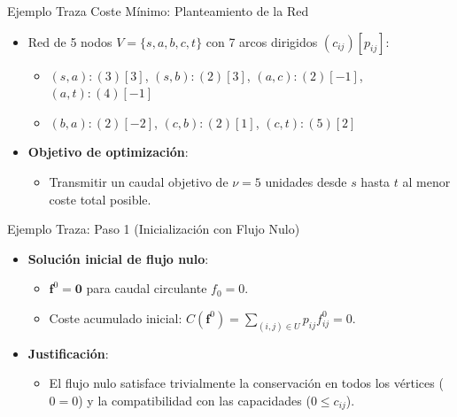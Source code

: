 \documentclass[
  ignorenonframetext,
]{beamer}
\providecommand{\tightlist}{%
  \setlength{\itemsep}{0pt}\setlength{\parskip}{0pt}}
\begin{document}
\begin{frame}{Ejemplo Traza Coste Mínimo: Planteamiento de la Red}
\label{ejemplo-traza-coste-muxednimo-planteamiento-de-la-red}
\begin{itemize}
\tightlist
\item
  Red de 5 nodos \(V = \{s, a, b, c, t\}\) con 7 arcos dirigidos
  \((c_{ij})[p_{ij}]\):

  \begin{itemize}
  \tightlist
  \item
    \((s,a): (3)[3]\), \((s,b): (2)[3]\), \((a,c): (2)[-1]\),
    \((a,t): (4)[-1]\)
  \item
    \((b,a): (2)[-2]\), \((c,b): (2)[1]\), \((c,t): (5)[2]\)
  \end{itemize}
\item
  \textbf{Objetivo de optimización}:

  \begin{itemize}
  \tightlist
  \item
    Transmitir un caudal objetivo de \(\nu = 5\) unidades desde \(s\)
    hasta \(t\) al menor coste total posible.
  \end{itemize}
\end{itemize}
\end{frame}

\begin{frame}{Ejemplo Traza: Paso 1 (Inicialización con Flujo Nulo)}
\label{ejemplo-traza-paso-1-inicializaciuxf3n-con-flujo-nulo}
\begin{itemize}
\tightlist
\item
  \textbf{Solución inicial de flujo nulo}:

  \begin{itemize}
  \tightlist
  \item
    \(\mathbf{f}^0 = \mathbf{0}\) para caudal circulante \(f_0 = 0\).
  \item
    Coste acumulado inicial:
    \(C(\mathbf{f}^0) = \sum_{(i,j) \in U} p_{ij} f_{ij}^0 = 0\).
  \end{itemize}
\item
  \textbf{Justificación}:

  \begin{itemize}
  \tightlist
  \item
    El flujo nulo satisface trivialmente la conservación en todos los
    vértices (\(0 = 0\)) y la compatibilidad con las capacidades
    (\(0 \le c_{ij}\)).
  \end{itemize}
\end{itemize}
\end{frame}
\end{document}
